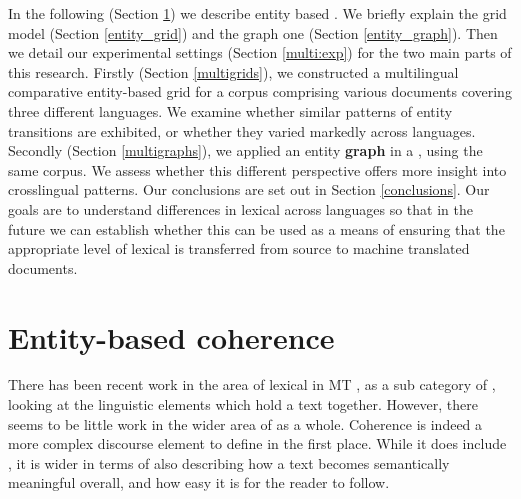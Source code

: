 \documentclass[output=paper]{langsci/langscibook.cls}
\begin{document}
In the following (Section \ref{entity}) we describe entity based . We briefly explain the grid model (Section \ref{entity_grid}) and the graph one (Section \ref{entity_graph}). Then we detail our experimental settings (Section \ref{multi:exp}) for the two main parts of this research.
Firstly (Section \ref{multigrids}), we constructed a multilingual comparative entity-based {\sc grid} for a corpus comprising various documents covering three different languages. We examine whether similar patterns of entity transitions are exhibited, or whether they varied markedly across languages. Secondly (Section \ref{multigraphs}), we applied an entity {\bf graph} in a , using the same corpus. 
We assess whether this different perspective offers more insight into crosslingual  patterns.   
Our conclusions are set out in Section \ref{conclusions}.
Our goals are to understand differences in lexical  across languages so that in the future we can establish whether this can be used as a means of ensuring that the appropriate level of lexical  is transferred from source to machine translated documents. 

\section{Entity-based coherence}\label{entity}

There has been recent work in the area of lexical  in MT \citep{Xiong:2013b,Xiong:2013,Tiedemann:2010,Hardmeier:2012,CarpuatSimard,WongKit}, as a sub category of , looking at the linguistic elements which hold a text together. However, there seems to be little work in the wider area of  as a whole. Coherence is indeed a more complex discourse element to define in the first place. While it does include , it is wider in terms of also describing how a text becomes semantically meaningful overall, and how easy it is for the reader to follow. 
\end{document}
